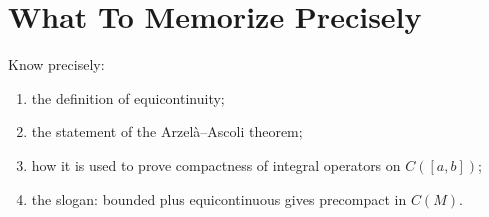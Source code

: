 \documentclass[11pt]{article}
\begin{document}
\section{What To Memorize Precisely}

\begin{focusbox}
Know precisely:
\begin{enumerate}
\item the definition of equicontinuity;
\item the statement of the Arzel\`a--Ascoli theorem;
\item how it is used to prove compactness of integral operators on $C([a,b])$;
\item the slogan: bounded plus equicontinuous gives precompact in $C(M)$.
\end{enumerate}
\end{focusbox}
\end{document}
